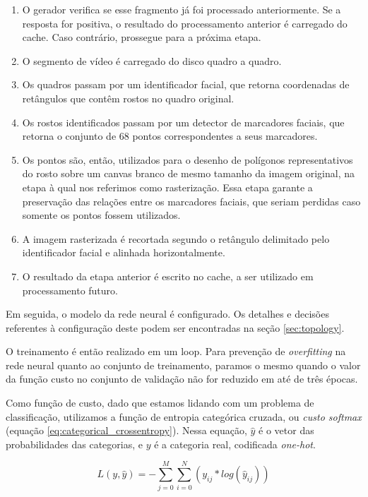 \begin{enumerate}
    \item O gerador verifica se esse fragmento já foi processado anteriormente. Se a resposta for positiva, o resultado do processamento anterior é carregado do cache. Caso contrário, prossegue para a próxima etapa.
    \item O segmento de vídeo é carregado do disco quadro a quadro. 
    \item Os quadros passam por um identificador facial, que retorna coordenadas de retângulos que contêm rostos no quadro original. 
    \item Os rostos identificados passam por um detector de marcadores faciais, que retorna o conjunto de 68 pontos correspondentes a seus marcadores. 
    \item Os pontos são, então, utilizados para o desenho de polígonos representativos do rosto sobre um canvas branco de mesmo tamanho da imagem original, na etapa à qual nos referimos como rasterização. Essa etapa garante a preservação das relações entre os marcadores faciais, que seriam perdidas caso somente os pontos fossem utilizados. 
    \item A imagem rasterizada é recortada segundo o retângulo delimitado pelo identificador facial e alinhada horizontalmente.
    \item O resultado da etapa anterior é escrito no cache, a ser utilizado em processamento futuro.
\end{enumerate}

Em seguida, o modelo da rede neural é configurado. Os detalhes e decisões referentes à configuração deste podem ser encontradas na seção \ref{sec:topology}. 

O treinamento é então realizado em um loop. Para prevenção de \textit{overfitting} na rede neural quanto ao conjunto de treinamento, paramos o mesmo quando o valor da função custo no conjunto de validação não for reduzido em até de três épocas.

Como função de custo, dado que estamos lidando com um problema de classificação, utilizamos a função de entropia categórica cruzada, ou \textit{custo softmax} (equação \ref{eq:categorical_crossentropy}). Nessa equação, $\hat{y}$ é o vetor das probabilidades das categorias, e $y$ é a categoria real, codificada \textit{one-hot}.

\begin{equation} \label{eq:categorical_crossentropy}
    L(y,\hat{y})=-\sum\limits_{j=0}^M\sum\limits_{i=0}^N(y_{ij}*log(\hat{y}_{ij}))
\end{equation}

